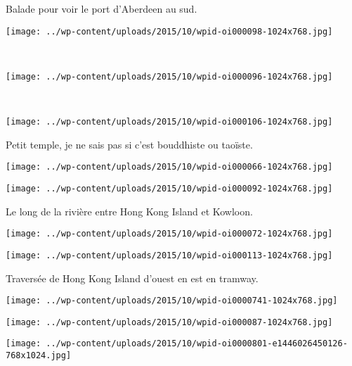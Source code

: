  Balade pour voir le port d'Aberdeen au sud. 
\begin{center} \texttt{[image: ../wp-content/uploads/2015/10/wpid-oi000098-1024x768.jpg]} \end{center}
\vspace{-\topsep}
\pagebreak
~
\vspace{0.25mm}
\begin{center} \texttt{[image: ../wp-content/uploads/2015/10/wpid-oi000096-1024x768.jpg]} \end{center}
~
\begin{center} \texttt{[image: ../wp-content/uploads/2015/10/wpid-oi000106-1024x768.jpg]} \end{center}
\vspace{-\topsep}
\pagebreak

  Petit temple, je ne sais pas si c'est bouddhiste ou taoïste. 
\begin{center} \texttt{[image: ../wp-content/uploads/2015/10/wpid-oi000066-1024x768.jpg]} \end{center}
\begin{center} \texttt{[image: ../wp-content/uploads/2015/10/wpid-oi000092-1024x768.jpg]} \end{center}
\vspace{-\topsep}
\vspace{-3.25mm}
\pagebreak
 
 Le long de la rivière entre Hong Kong Island et Kowloon. 
\begin{center} \texttt{[image: ../wp-content/uploads/2015/10/wpid-oi000072-1024x768.jpg]} \end{center}
\begin{center} \texttt{[image: ../wp-content/uploads/2015/10/wpid-oi000113-1024x768.jpg]} \end{center}
 \vspace{-\topsep}
 \vspace{-3.25mm}
 \pagebreak
 
 Traversée de Hong Kong Island d'ouest en est en tramway. 
\begin{center} \texttt{[image: ../wp-content/uploads/2015/10/wpid-oi0000741-1024x768.jpg]} \end{center}
\begin{center} \texttt{[image: ../wp-content/uploads/2015/10/wpid-oi000087-1024x768.jpg]} \end{center}
\begin{center} \texttt{[image: ../wp-content/uploads/2015/10/wpid-oi0000801-e1446026450126-768x1024.jpg]} \end{center}

